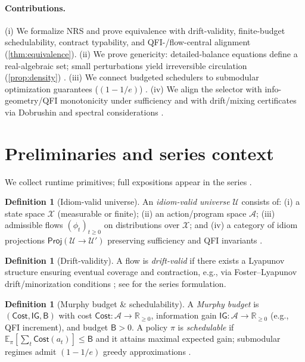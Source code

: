 \documentclass[11pt]{article}
\theoremstyle{plain}
\theoremstyle{definition}
\newtheorem{definition}[theorem]{Definition}
\theoremstyle{remark}
\newcommand{\EE}{\mathbb{E}}
\newcommand{\RR}{\mathbb{R}}
\newcommand{\1}{\mathds{1}}
\newcommand{\U}{\mathcal{U}}
\newcommand{\X}{\mathcal{X}}
\newcommand{\A}{\mathcal{A}}
\newcommand{\Budget}{\mathsf{B}}
\newcommand{\Cost}{\mathsf{Cost}}
\newcommand{\Gain}{\mathsf{IG}}
\newcommand{\Proj}{\mathsf{Proj}}
\begin{document}
\paragraph{Contributions.}
(i) We formalize NRS and prove equivalence with drift-validity, finite-budget schedulability, contract typability, and QFI-/flow-central alignment (\cref{thm:equivalence}). (ii) We prove genericity: detailed-balance equations define a real-algebraic set; small perturbations yield irreversible circulation (\cref{prop:density}) \cite{BochnakCosteRoy1998}. (iii) We connect budgeted schedulers to submodular optimization guarantees ($(1-1/e)$) \cite{Nemhauser1978}. (iv) We align the selector with info-geometry/QFI monotonicity under sufficiency \cite{AmariNagaoka2000,Petz2002,CoverThomas2006} and with drift/mixing certificates via Dobrushin and spectral considerations \cite{LevinPeresWilmer2009,Seneta2006}.

\section{Preliminaries and series context}
We collect runtime primitives; full expositions appear in the series \cite{QFI2025,IdiomProjections2025,ModalShell2025,ErgodicDrift2025,MurphyBudget2025,FlowCentrality2025,GradedEffects2025,MeasureContracts2025,FromSetsToQuotientFlows2025}.

\begin{definition}[Idiom-valid universe]
An \emph{idiom-valid universe} $\U$ consists of: (i) a state space $\X$ (measurable or finite); (ii) an action/program space $\A$; (iii) admissible flows $(\phi_t)_{t\ge 0}$ on distributions over $\X$; and (iv) a category of idiom projections $\Proj(\U\to \U')$ preserving sufficiency and QFI invariants \cite{IdiomProjections2025,QFI2025}.
\end{definition}

\begin{definition}[Drift-validity]
A flow is \emph{drift-valid} if there exists a Lyapunov structure ensuring eventual coverage and contraction, e.g., via Foster–Lyapunov drift/minorization conditions \cite{LevinPeresWilmer2009,Seneta2006}; see \cite{ErgodicDrift2025} for the series formulation.
\end{definition}

\begin{definition}[Murphy budget \& schedulability]
A \emph{Murphy budget} is $(\Cost,\Gain,\Budget)$ with cost $\Cost:\A\to\RR_{\ge 0}$, information gain $\Gain:\A\to\RR_{\ge 0}$ (e.g., QFI increment), and budget $\Budget>0$. A policy $\pi$ is \emph{schedulable} if $\EE_\pi[\sum_t \Cost(a_t)]\le \Budget$ and it attains maximal expected gain; submodular regimes admit $(1-1/e)$ greedy approximations \cite{Nemhauser1978,MurphyBudget2025}.
\end{definition}
\end{document}

